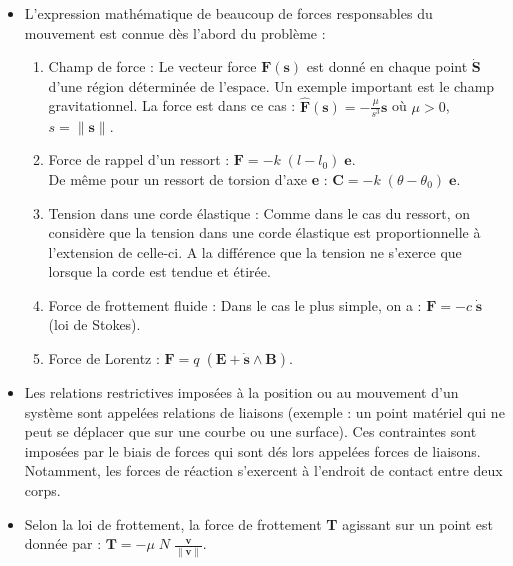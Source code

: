 \documentclass[a4paper]{article}
\begin{document}
\begin{itemize}
\item L'expression mathématique de beaucoup de forces responsables du mouvement est connue dès l'abord du problème : 
\begin{enumerate}
\item Champ de force : Le vecteur force $ \textbf{F}(\textbf{s}) $ est donné en chaque point $ \dot{\textbf{S}} $ d'une région déterminée de l'espace. Un exemple important est le champ gravitationnel. La force est dans ce cas : $\displaystyle \hat{\textbf{F}}(\textbf{s}) = - \frac{\mu}{s^3} \textbf{s} $ \qquad où \qquad $ \mu > 0 $, \qquad $ s = \| \textbf{s} \| $.
\item Force de rappel d'un ressort : $\displaystyle \textbf{F} = - k \; (l - l_0) \; \textbf{e} $. \\
De même pour un ressort de torsion d'axe \textbf{e} : $\displaystyle \textbf{C} = - k \; (\theta - \theta_0) \; \textbf{e} $.
\item Tension dans une corde élastique : Comme dans le cas du ressort, on considère que la tension dans une corde élastique est proportionnelle à l'extension de celle-ci. A la différence que la tension ne s'exerce que lorsque la corde est tendue et étirée.
\item Force de frottement fluide : Dans le cas le plus simple, on a : $\displaystyle \textbf{F} = - c \; \dot{\textbf{s}} $ \; (loi de Stokes).
\item Force de Lorentz : $\displaystyle \textbf{F} = q \; (\textbf{E} + \dot{\textbf{s}} \wedge \textbf{B}) $.
\end{enumerate}





\item Les relations restrictives imposées à la position ou au mouvement d'un système sont appelées relations de liaisons (exemple : un point matériel qui ne peut se déplacer que sur une courbe ou une surface). Ces contraintes sont imposées par le biais de forces qui sont dés lors appelées forces de liaisons. Notamment, les forces de réaction s'exercent à l'endroit de contact entre deux corps.





\item Selon la loi de frottement, la force de frottement \textbf{T} agissant sur un point est donnée par : $\displaystyle \textbf{T} = - \mu \; N \; \frac{\textbf{v}}{\| \textbf{v} \|} $.






\end{itemize}
\end{document}
